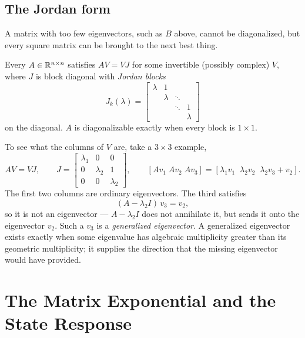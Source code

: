 \documentclass[11pt]{article}
\begin{document}
\subsection{The Jordan form}\label{sec:jordan}
A matrix with too few eigenvectors, such as $B$ above, cannot be diagonalized, but
every square matrix can be brought to the next best thing.
\begin{theorem}
Every $A\in\mathbb{R}^{n\times n}$ satisfies $AV=VJ$ for some invertible (possibly complex)
$V$, where $J$ is block diagonal with \emph{Jordan blocks}
\[
   J_k(\lambda)=\begin{bmatrix}\lambda&1&&\\&\lambda&\ddots&\\&&\ddots&1\\&&&\lambda\end{bmatrix}
\]
on the diagonal. $A$ is diagonalizable exactly when every block is $1\times1$.
\end{theorem}
To see what the columns of $V$ are, take a $3\times3$ example,
\[
   AV=VJ,\qquad J=\begin{bmatrix}\lambda_1&0&0\\0&\lambda_2&1\\0&0&\lambda_2\end{bmatrix},
   \qquad
   [Av_1\;Av_2\;Av_3]=[\lambda_1v_1\;\;\lambda_2v_2\;\;\lambda_2v_3+v_2].
\]
The first two columns are ordinary eigenvectors. The third satisfies
\[
   (A-\lambda_2I)\,v_3 = v_2 ,
\]
so it is not an eigenvector --- $A-\lambda_2I$ does not annihilate it, but sends it
onto the eigenvector $v_2$. Such a $v_3$ is a \emph{generalized eigenvector}. A
generalized eigenvector exists exactly when some eigenvalue has algebraic
multiplicity greater than its geometric multiplicity; it supplies the direction
that the missing eigenvector would have provided.

\section{The Matrix Exponential and the State Response}\label{sec:expm}
\end{document}

